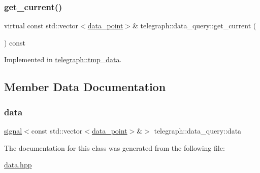 \subsubsection{\texorpdfstring{get\+\_\+current()}{get\_current()}}
{\footnotesize\ttfamily virtual const std\+::vector$<$\hyperlink{classtelegraph_1_1data__point}{data\+\_\+point}$>$\& telegraph\+::data\+\_\+query\+::get\+\_\+current (\begin{DoxyParamCaption}{ }\end{DoxyParamCaption}) const\hspace{0.3cm}{\ttfamily [pure virtual]}}



Implemented in \hyperlink{classtelegraph_1_1tmp__data_a0cc69096544afeaffaae5f25587dc62f}{telegraph\+::tmp\+\_\+data}.



\subsection{Member Data Documentation}
\mbox{\label{classtelegraph_1_1data__query_a81705835f67a1e5a4ce2c1009847eddc}} 
\subsubsection{\texorpdfstring{data}{data}}
{\footnotesize\ttfamily \hyperlink{classtelegraph_1_1signal}{signal}$<$const std\+::vector$<$\hyperlink{classtelegraph_1_1data__point}{data\+\_\+point}$>$\&$>$ telegraph\+::data\+\_\+query\+::data}



The documentation for this class was generated from the following file\+:\begin{DoxyCompactItemize}
\item 
\hyperlink{data_8hpp}{data.\+hpp}\end{DoxyCompactItemize}
